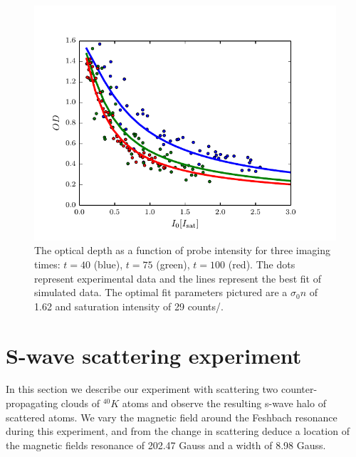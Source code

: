 \documentclass[12pt]{iopart}
\begin{document}
\begin{figure}
	\includegraphics{figure8.pdf}
\caption{The optical depth as a function of probe intensity for three imaging times: $t=40$\us{} (blue),  $t=75$\us{} (green),  $t=100$\us{} (red). The dots represent experimental data and the lines represent the best fit of simulated data. The optimal fit parameters pictured are a $\sigma_0 n$ of 1.62 and saturation intensity of 29 counts/\us{}. }  
\label{fig:isatCalib}
\end{figure}


\section{S-wave scattering experiment}
In this section we describe our experiment with scattering two counter-propagating clouds of $^{40}K$ atoms and observe the resulting s-wave halo of scattered atoms. We vary the magnetic field around the Feshbach resonance during this experiment, and from the change in scattering deduce a location of the magnetic fields resonance of 202.47 Gauss and a width of 8.98 Gauss.
\end{document}
